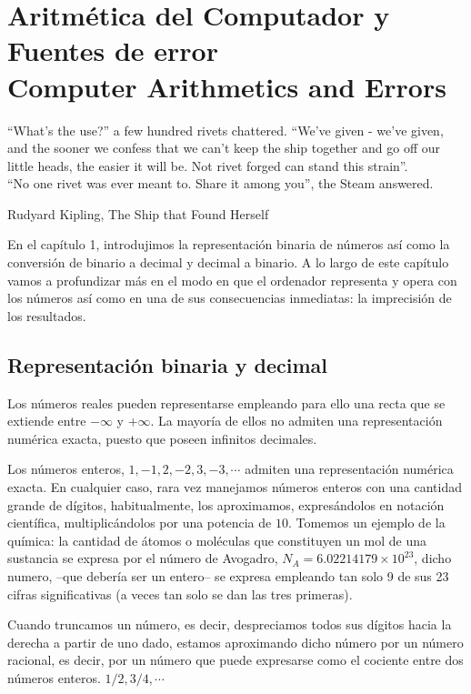 \chapter{Aritmética del Computador y Fuentes de error\\ Computer Arithmetics and Errors}\label{chp:arit}
\epigraph{``What's the use?'' a few hundred rivets chattered. ``We've given - we've given, and the sooner we confess that we can't keep the ship together and go off our little heads, the easier it will be. Not rivet forged 
 can stand this strain''.\\
 ``No one rivet was ever meant to. Share it among you'', the Steam answered.}{Rudyard Kipling, The Ship that Found Herself}

\begin{paracol}{2}
En el capítulo 1, introdujimos la representación binaria de números así como la conversión de binario a decimal y decimal a binario. A lo largo de este capítulo vamos a profundizar más en el modo en que el ordenador representa y opera con los números así como en una de sus consecuencias inmediatas: la imprecisión de los resultados. 

\section{Representación binaria y decimal}

Los números reales pueden representarse empleando para ello una recta que se extiende entre $-\infty$ y $+\infty$. La mayoría de ellos no admiten una representación numérica exacta, puesto que poseen infinitos decimales. 

Los números enteros, $1, -1, 2, -2, 3, -3, \cdots$ admiten una representación numérica exacta.  En cualquier caso, rara vez manejamos números enteros con una cantidad grande de dígitos, habitualmente, los aproximamos, expresán\-dolos en notación científica, multiplicándolos por una potencia de $10$. Tomemos un ejemplo de la química: la cantidad de átomos o moléculas que constituyen un mol de una sustancia se expresa por el número de Avogadro, $N_A=6.02214179 \times 10^{23}$, dicho numero, --que debería ser un entero--  se expresa empleando tan solo 9 de sus 23 cifras significativas (a veces tan solo se dan las tres primeras). 

 Cuando truncamos un número, es decir, despreciamos todos sus dígitos hacia la derecha a partir de uno dado, estamos aproximando dicho número por un  número racional, es decir, por un número que puede expresarse como el cociente entre dos números enteros. $1/2, 3/4, \cdots$ 


\end{paracol}
